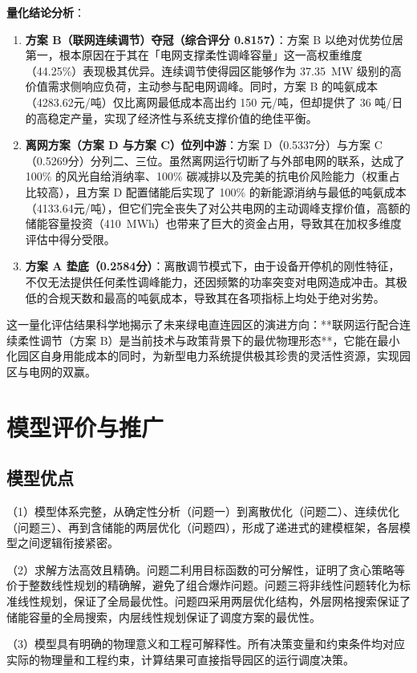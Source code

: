 \textbf{量化结论分析}：
\begin{enumerate}
    \item \textbf{方案 B（联网连续调节）夺冠（综合评分 0.8157）}：方案 B 以绝对优势位居第一，根本原因在于其在「电网支撑柔性调峰容量」这一高权重维度（44.25\%）表现极其优异。连续调节使得园区能够作为 37.35~MW 级别的高价值需求侧响应负荷，主动参与配电网调峰。同时，方案 B 的吨氨成本（4283.62元/吨）仅比离网最低成本高出约 150 元/吨，但却提供了 36 吨/日的高稳定产量，实现了经济性与系统支撑价值的绝佳平衡。
    \item \textbf{离网方案（方案 D 与方案 C）位列中游}：方案 D（0.5337分）与方案 C（0.5269分）分列二、三位。虽然离网运行切断了与外部电网的联系，达成了 100\% 的风光自给消纳率、100\% 碳减排以及完美的抗电价风险能力（权重占比较高），且方案 D 配置储能后实现了 100\% 的新能源消纳与最低的吨氨成本（4133.64元/吨），但它们完全丧失了对公共电网的主动调峰支撑价值，高额的储能容量投资（410~MWh）也带来了巨大的资金占用，导致其在加权多维度评估中得分受限。
    \item \textbf{方案 A 垫底（0.2584分）}：离散调节模式下，由于设备开停机的刚性特征，不仅无法提供任何柔性调峰能力，还因频繁的功率突变对电网造成冲击。其极低的合规天数和最高的吨氨成本，导致其在各项指标上均处于绝对劣势。
\end{enumerate}

这一量化评估结果科学地揭示了未来绿电直连园区的演进方向：**联网运行配合连续柔性调节（方案 B）是当前技术与政策背景下的最优物理形态**，它能在最小化园区自身用能成本的同时，为新型电力系统提供极其珍贵的灵活性资源，实现园区与电网的双赢。

\section{模型评价与推广}

\subsection{模型优点}

（1）模型体系完整，从确定性分析（问题一）到离散优化（问题二）、连续优化（问题三）、再到含储能的两层优化（问题四），形成了递进式的建模框架，各层模型之间逻辑衔接紧密。

（2）求解方法高效且精确。问题二利用目标函数的可分解性，证明了贪心策略等价于整数线性规划的精确解，避免了组合爆炸问题。问题三将非线性问题转化为标准线性规划，保证了全局最优性。问题四采用两层优化结构，外层网格搜索保证了储能容量的全局搜索，内层线性规划保证了调度方案的最优性。

（3）模型具有明确的物理意义和工程可解释性。所有决策变量和约束条件均对应实际的物理量和工程约束，计算结果可直接指导园区的运行调度决策。

